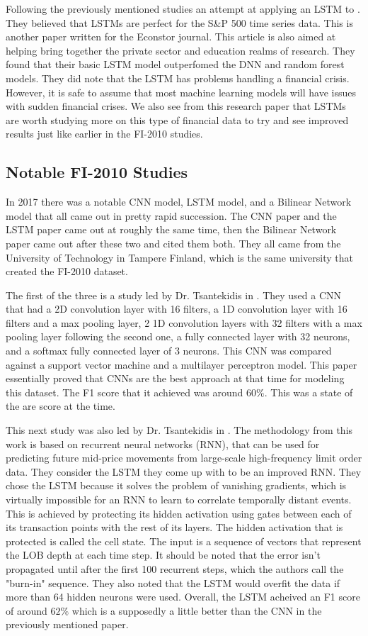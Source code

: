 \documentclass{article}
\theoremstyle{plain}
\theoremstyle{definition}
\numberwithin{equation}{section}
\numberwithin{theorem}{section}
\numberwithin{lemma}{section}
\numberwithin{definition}{section}
\numberwithin{proposition}{section}
\numberwithin{corollary}{section}
\begin{document}
	
	Following the previously mentioned studies an attempt at applying an LSTM to \cite{Fischer2017Deep}. They believed that LSTMs are perfect for the S\&P 500 time series data. This is another paper written for the Econstor journal. This article is also aimed at helping bring together the private sector and education realms of research. They found that their basic LSTM model outperfomed the DNN and random forest models. They did note that the LSTM has problems handling a financial crisis. However, it is safe to assume that most machine learning models will have issues with sudden financial crises. We also see from this research paper that LSTMs are worth studying more on this type of financial data to try and see improved results just like earlier in the FI-2010 studies.
	
	\subsection{Notable FI-2010 Studies}
	In 2017 there was a notable CNN model, LSTM model, and a Bilinear Network model that all came out in pretty rapid succession. The CNN paper and the LSTM paper came out at roughly the same time, then the Bilinear Network paper came out after these two and cited them both. They all came from the University of Technology in Tampere Finland, which is the same university that created the FI-2010 dataset.
	
	
	The first of the three is a study led by Dr. Tsantekidis in \cite{Tsantekidis2017F}. They used a CNN that had a 2D convolution layer with 16 filters, a 1D convolution layer with 16 filters and a max pooling layer, 2 1D convolution layers with 32 filters with a max pooling layer following the second one, a fully connected layer with 32 neurons, and a softmax fully connected layer of 3 neurons. This CNN was compared against a support vector machine and a multilayer perceptron model. This paper essentially proved that CNNs are the best approach at that time for modeling this dataset. The F1 score that it achieved was around $60\%$. This was a state of the are score at the time.
	
	
	This next study was also led by Dr. Tsantekidis in \cite{Tsantekidis2017U}. The methodology from this work is based on recurrent neural networks (RNN), that can be used for predicting future mid-price movements from large-scale high-frequency limit order data. They consider the LSTM they come up with to be an improved RNN. They chose the LSTM because it solves the problem of vanishing gradients, which is virtually impossible for an RNN to learn to correlate temporally distant events. This is achieved by protecting its hidden activation using gates between each of its transaction points with the rest of its layers. The hidden activation that is protected is called the cell state. The input is a sequence of vectors that represent the LOB depth at each time step. It should be noted that the error isn't propagated until after the first 100 recurrent steps, which the authors call the "burn-in" sequence. They also noted that the LSTM would overfit the data if more than 64 hidden neurons were used. Overall, the LSTM acheived an F1 score of around $62\%$ which is a supposedly a little better than the CNN in the previously mentioned paper.
	
\end{document}
